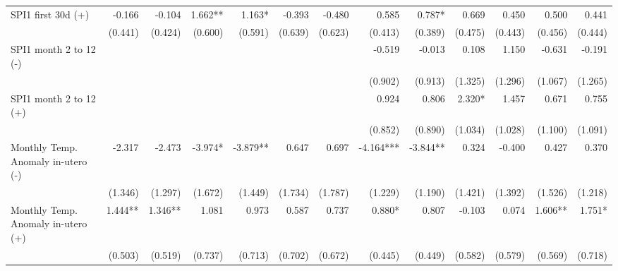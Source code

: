 \begin{table}[H]
\begin{adjustbox}{max width=\linewidth}
\begin{tabular}{lrrrrrrrrrrrr}
    SPI1 first 30d  (+)                         &       -0.166 &      -0.104 &     1.662** &       1.163* &     -0.393   &      -0.480 &     0.585 &      0.787* &         0.669 &        0.450 &        0.500 &        0.441 \\ 
                                                &      (0.441) &     (0.424) &     (0.600) &      (0.591) &    (0.639)   &     (0.623) &   (0.413) &     (0.389) &       (0.475) &      (0.443) &      (0.456) &      (0.444) \\ 
    SPI1 month 2 to 12  (-)                     &              &             &             &              &              &             &    -0.519 &      -0.013 &         0.108 &        1.150 &       -0.631 &       -0.191 \\ 
                                                &              &             &             &              &              &             &   (0.902) &     (0.913) &       (1.325) &      (1.296) &      (1.067) &      (1.265) \\ 
    SPI1 month 2 to 12  (+)                     &              &             &             &              &              &             &     0.924 &       0.806 &        2.320* &        1.457 &        0.671 &        0.755 \\ 
                                                &              &             &             &              &              &             &   (0.852) &     (0.890) &       (1.034) &      (1.028) &      (1.100) &      (1.091) \\ 
    Monthly Temp. Anomaly in-utero   (-)        &       -2.317 &      -2.473 &     -3.974* &     -3.879** &      0.647   &       0.697 & -4.164*** &    -3.844** &         0.324 &       -0.400 &        0.427 &        0.370 \\ 
                                                &      (1.346) &     (1.297) &     (1.672) &      (1.449) &    (1.734)   &     (1.787) &   (1.229) &     (1.190) &       (1.421) &      (1.392) &      (1.526) &      (1.218) \\ 
    Monthly Temp. Anomaly in-utero  (+)         &      1.444** &     1.346** &       1.081 &        0.973 &      0.587   &       0.737 &    0.880* &       0.807 &        -0.103 &        0.074 &      1.606** &       1.751* \\ 
                                                &      (0.503) &     (0.519) &     (0.737) &      (0.713) &    (0.702)   &     (0.672) &   (0.445) &     (0.449) &       (0.582) &      (0.579) &      (0.569) &      (0.718) \\ 

\end{tabular}
\end{adjustbox}
\end{table}
